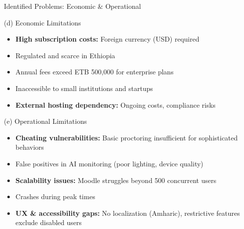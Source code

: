 \begin{frame}{Identified Problems: Economic \& Operational}
    \begin{alertblock}{(d) Economic Limitations}
        \begin{itemize}
            \item \textbf{High subscription costs:} Foreign currency (USD) required
            \item Regulated and scarce in Ethiopia
            \item Annual fees exceed ETB 500,000 for enterprise plans
            \item Inaccessible to small institutions and startups
            \item \textbf{External hosting dependency:} Ongoing costs, compliance risks
        \end{itemize}
    \end{alertblock}
    
    \begin{alertblock}{(e) Operational Limitations}
        \begin{itemize}
            \item \textbf{Cheating vulnerabilities:} Basic proctoring insufficient for sophisticated behaviors
            \item False positives in AI monitoring (poor lighting, device quality)
            \item \textbf{Scalability issues:} Moodle struggles beyond 500 concurrent users
            \item Crashes during peak times
            \item \textbf{UX \& accessibility gaps:} No localization (Amharic), restrictive features exclude disabled users
        \end{itemize}
    \end{alertblock}
\end{frame}


